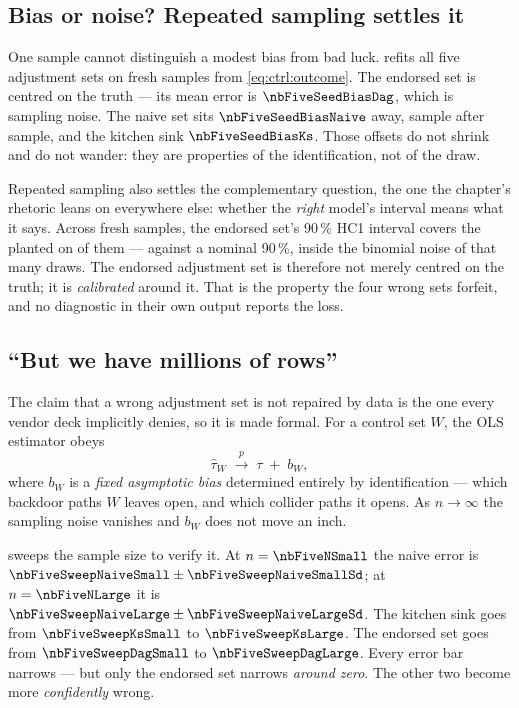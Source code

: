 \subsection*{Bias or noise? Repeated sampling settles it}

One sample cannot distinguish a modest bias from bad luck.  refits all five
adjustment sets on \nbFiveNSeeds{} fresh samples from \cref{eq:ctrl:outcome}. The endorsed set is
centred on the truth --- its mean error is $\nbFiveSeedBiasDag$, which is sampling noise. The
naive set sits $\nbFiveSeedBiasNaive$ away, sample after sample, and the kitchen sink
$\nbFiveSeedBiasKs$. Those offsets do not shrink and do not wander: they are properties of the
identification, not of the draw.

Repeated sampling also settles the complementary question, the one the chapter's rhetoric leans on
everywhere else: whether the \emph{right} model's interval means what it says. Across
\nbFiveCovN{} fresh samples, the endorsed set's 90\,\% HC1 interval covers the planted
\eur{\nbFiveTrueAte} on \nbFiveCovK{} of them --- \pc{\nbFiveCovPct} against a nominal 90\,\%,
inside the binomial noise of that many draws. The endorsed adjustment set is therefore not merely
centred on the truth; it is \emph{calibrated} around it. That is the property the four wrong sets
forfeit, and no diagnostic in their own output reports the loss.



\subsection*{``But we have millions of rows''}

The claim that a wrong adjustment set is not repaired by data is the one every vendor deck
implicitly denies, so it is made formal. For a control set $W$, the OLS estimator obeys
%
\begin{equation}
  \hat\tau_W \;\xrightarrow{\ p\ }\; \tau \;+\; b_W ,
  \label{eq:ctrl:asymptotic}
\end{equation}
%
where $b_W$ is a \emph{fixed asymptotic bias} determined entirely by identification --- which
backdoor paths $W$ leaves open, and which collider paths it opens. As $n \to \infty$ the sampling
noise vanishes and $b_W$ does not move an inch.

 sweeps the sample size to verify it. At $n = \nbFiveNSmall$ the naive
error is $\nbFiveSweepNaiveSmall \pm \nbFiveSweepNaiveSmallSd$; at $n = \nbFiveNLarge$ it is
$\nbFiveSweepNaiveLarge \pm \nbFiveSweepNaiveLargeSd$. The kitchen sink goes from
$\nbFiveSweepKsSmall$ to $\nbFiveSweepKsLarge$. The endorsed set goes from
$\nbFiveSweepDagSmall$ to $\nbFiveSweepDagLarge$. Every error bar narrows --- but only the
endorsed set narrows \emph{around zero}. The other two become more \emph{confidently} wrong.

